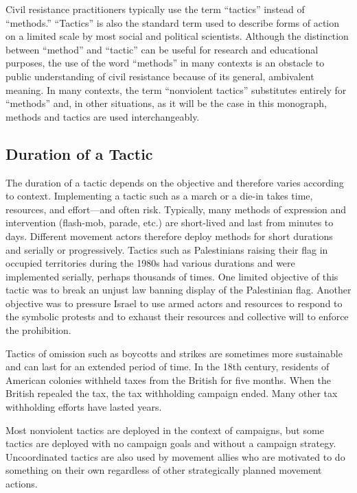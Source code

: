 \documentclass[twoside,a4paper,12pt,fleqn,openany]{extbook}
\begin{document}
Civil resistance practitioners typically use the term “tactics” instead of “methods.” “Tactics” is also the standard term used to describe forms of action on a limited scale by most social and political scientists. Although the distinction between “method” and “tactic” can be useful for research and educational purposes, the use of the word “methods” in many contexts is an obstacle to public understanding of civil resistance because of its general, ambivalent meaning. In many contexts, the term “nonviolent tactics” substitutes entirely for “methods” and, in other situations, as it will be the case in this monograph, methods and tactics are used interchangeably.

\subsection*{Duration of a Tactic}

The duration of a tactic depends on the objective and therefore varies according to context. Implementing a tactic such as a march or a die-in takes time, resources, and effort—and often risk. Typically, many methods of expression and intervention (flash-mob, parade, etc.) are short-lived and last from minutes to days. Different movement actors therefore deploy methods for short durations and serially or progressively. Tactics such as Palestinians raising their flag in occupied territories during the 1980s had various durations and were implemented serially, perhaps thousands of times. One limited objective of this tactic was to break an unjust law banning display of the Palestinian flag. Another objective was to pressure Israel to use armed actors and resources to respond to the symbolic protests and to exhaust their resources and collective will to enforce the prohibition.

Tactics of omission such as boycotts and strikes are sometimes more sustainable and can last for an extended period of time. In the 18th century, residents of American colonies withheld taxes from the British for five months. When the British repealed the tax, the tax withholding campaign ended. Many other tax withholding efforts have lasted years.

Most nonviolent tactics are deployed in the context of campaigns, but some tactics are deployed with no campaign goals and without a campaign strategy. Uncoordinated tactics are also used by movement allies who are motivated to do something on their own regardless of other strategically planned movement actions.
\end{document}
